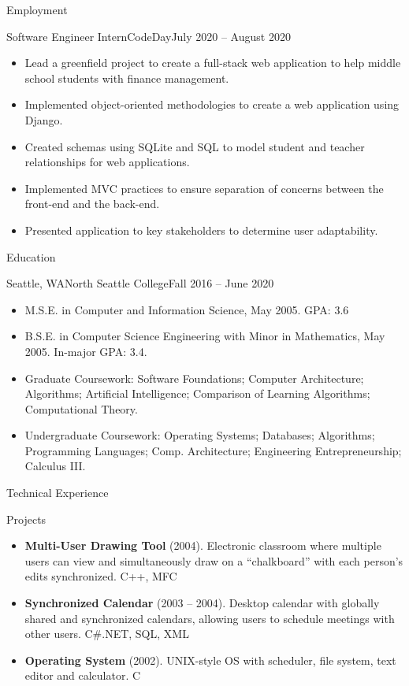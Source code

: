 \documentclass[]{mcdowellcv}
\begin{document}
\begin{cvsection}{Employment}
		\begin{cvsubsection}{Software Engineer Intern}{CodeDay}{July 2020 -- August 2020}		
			\begin{itemize}
				\item Lead a greenfield project to create a full-stack web application to help middle school students with finance management.
				\item Implemented object-oriented methodologies to create a web application using Django.
				\item Created schemas using SQLite and SQL to model student and teacher relationships for web applications.
				\item Implemented MVC practices to ensure separation of concerns between the front-end and the back-end.
				\item Presented application to key stakeholders to determine user adaptability.
			\end{itemize}
		\end{cvsubsection}
	\end{cvsection}
	
	\begin{cvsection}{Education}
		\begin{cvsubsection}{Seattle, WA}{North Seattle College}{Fall 2016 -- June 2020}
			\begin{itemize}
				\item M.S.E. in Computer and Information Science, May 2005. GPA: 3.6
				\item B.S.E. in Computer Science Engineering with Minor in Mathematics, May 2005.  In-major GPA: 3.4.
				\item Graduate Coursework: Software Foundations; Computer Architecture; Algorithms; Artificial Intelligence; Comparison of Learning Algorithms; Computational Theory.
				\item Undergraduate Coursework: Operating Systems; Databases; Algorithms; Programming Languages; Comp. Architecture; Engineering Entrepreneurship; Calculus III.
			\end{itemize}
		\end{cvsubsection}
	\end{cvsection}
	
	\begin{cvsection}{Technical Experience}
		\begin{cvsubsection}{Projects}{}{}
			\begin{itemize}
				\item \textbf{Multi-User Drawing Tool} (2004). Electronic classroom where multiple users can view and simultaneously draw on a “chalkboard” with each person’s edits synchronized.  C++, MFC
				\item \textbf{Synchronized Calendar} (2003 – 2004). Desktop calendar with globally shared and synchronized calendars, allowing users to schedule meetings with other users.  C\#.NET, SQL, XML
				\item \textbf{Operating System} (2002).  UNIX-style OS with scheduler, file system, text editor and calculator. C
			\end{itemize}
		\end{cvsubsection}
	\end{cvsection}
	
\end{document}
